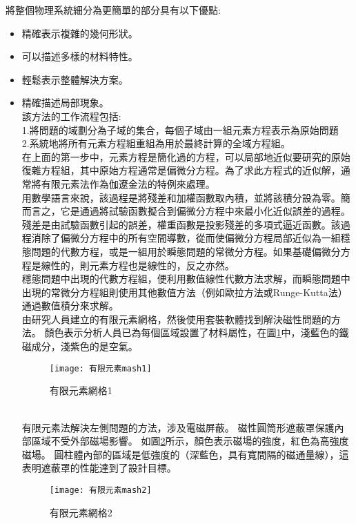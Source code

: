 將整個物理系統細分為更簡單的部分具有以下優點:\\
\begin{itemize}
\item 精確表示複雜的幾何形狀。\\
\item 可以描述多樣的材料特性。\\
\item 輕鬆表示整體解決方案。\\
\item 精確描述局部現象。\\

該方法的工作流程包括:\\

1.將問題的域劃分為子域的集合，每個子域由一組元素方程表示為原始問題\\

2.系統地將所有元素方程組重組為用於最終計算的全域方程組。\\

在上面的第一步中，元素方程是簡化過的方程，可以局部地近似要研究的原始復雜方程組，其中原始方程通常是偏微分方程。為了求此方程式的近似解，通常將有限元素法作為伽遼金法的特例來處理。\\

用數學語言來說，該過程是將殘差和加權函數取內積，並將該積分設為零。簡而言之，它是通過將試驗函數擬合到偏微分方程中來最小化近似誤差的過程。殘差是由試驗函數引起的誤差，權重函數是投影殘差的多項式逼近函數。該過程消除了偏微分方程中的所有空間導數，從而使偏微分方程局部近似為一組穩態問題的代數方程，或是一組用於瞬態問題的常微分方程。如果基礎偏微分方程是線性的，則元素方程也是線性的，反之亦然。\\

穩態問題中出現的代數方程組，便利用數值線性代數方法求解，而瞬態問題中出現的常微分方程組則使用其他數值方法（例如歐拉方法或Runge-Kutta法）通過數值積分來求解。\\

由研究人員建立的有限元素網格，然後使用套裝軟體找到解決磁性問題的方法。 顏色表示分析人員已為每個區域設置了材料屬性，在圖\ref{2.84}中，淺藍色的鐵磁成分，淺紫色的是空氣。\\
\begin{figure}[hbt!]
\begin{center}
\texttt{[image: 有限元素mash1]}
\caption{\Large 有限元素網格1}\label{2.84}
\end{center}
\end{figure}
\\

有限元素法解決左側問題的方法，涉及電磁屏蔽。 磁性圓筒形遮蔽罩保護內部區域不受外部磁場影響。 如圖\ref{2.85}所示，顏色表示磁場的強度，紅色為高強度磁場。 圓柱體內部的區域是低強度的（深藍色，具有寬間隔的磁通量線），這表明遮蔽罩的性能達到了設計目標。\\
\begin{figure}[hbt!]
\begin{center}
\texttt{[image: 有限元素mash2]}
\caption{\Large 有限元素網格2}\label{2.85}
\end{center}
\end{figure}
\\

\end{itemize}
